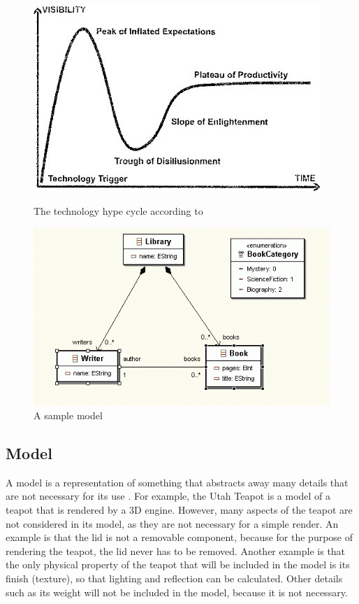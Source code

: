 \begin{figure}
\begin{minipage}{0.5\textwidth}
	\includegraphics[width=0.9\linewidth]{figures/mde_pos.jpg}
\caption{The technology hype cycle according to \citet{brambillaBook}}
\label{mde_pos}
\end{minipage}
\begin{minipage}{0.49\textwidth}
	\includegraphics[width=0.9\linewidth]{figures/sample_model.png}
\caption{A sample model \citep{sampleModel}}
\label{uml_sample}
\end{minipage}
\end{figure}

\subsection{Model}

A model is a representation of something that abstracts away many details that are not necessary for its use \citep{brambillaBook}. For example, the Utah Teapot \citep{Crow:1987:OT} is a model of a teapot that is rendered by a 3D engine. However, many aspects of the teapot are not considered in its model, as they are not necessary for a simple render. An example is that the lid is not a removable component, because for the purpose of rendering the teapot, the lid never has to be removed. Another example is that the only physical property of the teapot that will be included in the model is its finish (texture), so that lighting and reflection can be calculated. Other details such as its weight will not be included in the model, because it is not necessary.

